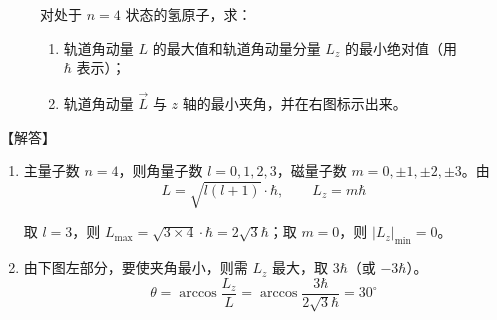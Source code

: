 \documentclass[UTF8]{ctexart}
\begin{document}
{
\begin{figure}[htb]
\begin{minipage}[t]{0.74\textwidth}
    \color{cyan!50!black}
    \vspace{0pt}
    对处于 $n=4$ 状态的氢原子，求：

    \begin{enumerate}
    \color{cyan!50!black}
      \item 轨道角动量 $L$ 的最大值和轨道角动量分量 $L_z$ 的最小绝对值（用 $\hbar$ 表示）；
      \item 轨道角动量 $\vec{L}$ 与 $z$ 轴的最小夹角，并在右图标示出来。
    \end{enumerate}
\end{minipage}
\begin{minipage}[t]{0.25\textwidth}
\color{cyan!50!black}
\vspace{0pt}
\centering
{}
\end{minipage}
\end{figure}
}

\vspace{-0.8cm}

【解答】
\begin{enumerate}[itemsep=0pt, parsep=0pt]
  \item 主量子数 $n=4$，则角量子数 $l=0,1,2,3$，磁量子数 $m=0,\pm 1,\pm 2,\pm 3$。由
  \begin{equation*}
    L=\sqrt{l(l+1)}\cdot \hbar,\qquad L_z = m \hbar
  \end{equation*}

  取 $l=3$，则 $L_{\max}=\sqrt{3\times 4}\cdot \hbar = 2\sqrt{3}\hbar$；取 $m=0$，则 $|L_z|_{\min}=0$。

  \item 由下图左部分，要使夹角最小，则需 $L_z$ 最大，取 $3\hbar$（或 $-3\hbar$）。
  \begin{equation*}
    \theta = \arccos \dfrac{L_z}{L} = \arccos\dfrac{3\hbar}{2\sqrt{3}\hbar} = 30^\circ
  \end{equation*}
\end{enumerate}

\end{document}
